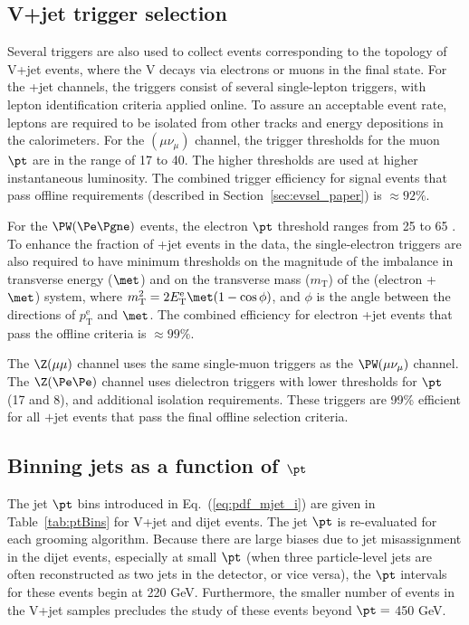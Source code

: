 \subsection{V+jet trigger selection}
\label{sec:dataSampleAndEventSelectionVjet}


Several triggers are also used to collect events corresponding to
the topology of V+jet events, where the V decays via electrons or
muons in the final state. 
For the \PW+jet channels, the triggers consist of several single-lepton 
triggers, with lepton identification criteria applied online. 
To assure an acceptable event rate, leptons are required to be isolated from other
tracks and energy depositions in the calorimeters. 
For the \PW$(\mu\nu_\mu)$ channel, the trigger thresholds for the
muon $\pt$ are in the range of 17 to 40\GeV.
The higher thresholds are used at higher instantaneous luminosity. 
The combined trigger efficiency for signal events 
that pass offline requirements
(described in Section~\ref{sec:evsel_paper}) is ${\approx} 92\%$.


For the $\PW(\Pe\Pgne)$ events, the electron $\pt$ threshold ranges 
from 25 to 65 \GeV. 
To enhance the fraction of \PW+jet events in the data, the
single-electron triggers are also required to have minimum thresholds 
on the magnitude of the imbalance 
in transverse energy ($\met$) and on the transverse mass 
($m_\mathrm{T}$) of the (electron + $\met$) system,
where $m_\mathrm{T}^2 = 2E_\mathrm{T}^{\mathrm{e}}\met(1-\cos\phi)$,
and $\phi$ is the angle between the directions of $p_{\mathrm{T}}^{\mathrm{e}}$ and $\met$. 
The combined efficiency for electron \PW+jet events that pass the offline 
criteria is ${\approx} 99\%$.


 The $\Z(\mu\mu)$ channel uses the same single-muon triggers as the
 $\PW(\mu\nu_\mu)$ channel. The $\Z (\Pe\Pe)$ channel uses dielectron triggers
 with lower thresholds for $\pt$ (17 and 8\GeV), and additional isolation
 requirements. These triggers are 99\% efficient for all
 {\Z}$+$jet events that pass the final offline selection criteria.

\subsection{Binning jets as a function of $\pt$}
\label{sec:ptBinAssignment}


The jet $\pt$ bins introduced in Eq.~(\ref{eq:pdf_mjet_i}) are given in
Table~\ref{tab:ptBins} for V+jet and dijet events. The jet $\pt$ is re-evaluated for each grooming
algorithm. 
Because there are large biases due to jet misassignment in the dijet
events, especially at small $\pt$ (when three particle-level jets are
often reconstructed as two jets in the detector, or vice versa), 
the $\pt$ intervals for these events begin at 220 GeV. 
Furthermore, the smaller number of events in the V+jet samples precludes the
study of these events beyond $\pt=$ 450 GeV.


